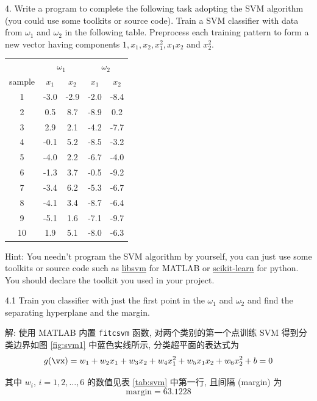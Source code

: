 \documentclass[openany]{ctexbook}
\theoremstyle{kaiti}
\theoremstyle{normal}
\begin{document}
4. Write a program to complete the following task adopting the SVM algorithm (you could use some toolkits or source code). Train a SVM classifier with data from $\omega_1$ and $\omega_2$ in the following table. Preprocess each training pattern to form a new vector having components $1,x_1,x_2,x_1^2,x_1x_2$ and $ x_2^2$.

\begin{table}[ht]
	\centering
	\begin{tabular}{ccccc}
		\hline
    ~&\multicolumn{2}{c}{$\omega_1$} & \multicolumn{2}{c}{$\omega_2$}\\
    \cmidrule(r){2-3} \cmidrule(r){4-5}
		sample & $x_1$ & $x_2$ & $x_1$ & $x_2$\\
		\hline
		1  & -3.0 & -2.9 & -2.0 & -8.4\\
		2  & 0.5  & 8.7 & -8.9 & 0.2\\
		3  & 2.9  & 2.1 & -4.2 & -7.7\\
		4  & -0.1 & 5.2 & -8.5 & -3.2\\
		5  & -4.0 & 2.2 & -6.7 & -4.0\\
		6  & -1.3 & 3.7 & -0.5 & -9.2\\
		7  & -3.4 & 6.2 & -5.3 & -6.7\\
		8  & -4.1 & 3.4 & -8.7 & -6.4\\
		9  & -5.1 & 1.6 & -7.1 & -9.7\\
		10 & 1.9  & 5.1 & -8.0 & -6.3\\
		\hline
	\end{tabular}
\end{table}

Hint: You needn't program the SVM algorithm by yourself, you can just use some toolkits or source code such as \href{http://www.csie.ntu.edu.tw/~cjlin/libsvm/}{libsvm} for MATLAB or \href{https://scikit-learn.org/stable/modules/svm.html#svm-classification}{scikit-learn} for python. You should declare the toolkit you used in your project.

4.1 Train you classifier with just the first point in the $\omega_1$ and $\omega_2$ and find the separating hyperplane and the margin.

解: 使用 MATLAB 内置 \verb|fitcsvm| 函数, 对两个类别的第一个点训练 SVM 得到分类边界如图 \ref{fig:svm1} 中蓝色实线所示, 分类超平面的表达式为
\begin{equation}
  g(\vx)=w_1+w_2x_1+w_3x_2+w_4x_1^2+w_5x_1x_2+w_6x_2^2+b=0
\end{equation}

其中 $w_i$, $i=1,2,\dots,6$ 的数值见表 \ref{tab:svm} 中第一行, 且间隔 (margin) 为
\begin{equation}
  \mathrm{margin}=63.1228
\end{equation}
\end{document}
